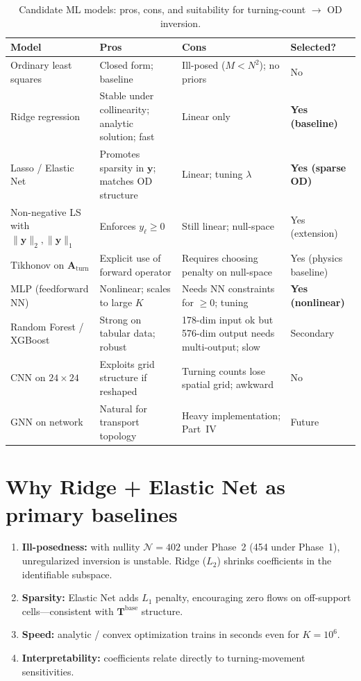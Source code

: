 \documentclass[11pt,a4paper]{report}
\newcommand{\Tbase}{\mathbf{T}^{\mathrm{base}}}
\newcommand{\mathbfy}{\mathbf{y}}
\newcommand{\Aturn}{\mathbf{A}_{\mathrm{turn}}}
\begin{document}
\begin{table}[ht]
\centering
\caption{Candidate ML models: pros, cons, and suitability for turning-count $\to$ OD inversion.}
\label{tab:models}
\footnotesize
\begin{tabular}{@{}p{2.8cm}p{3.8cm}p{3.8cm}p{2.8cm}@{}}
\toprule
\textbf{Model} & \textbf{Pros} & \textbf{Cons} & \textbf{Selected?} \\
\midrule
Ordinary least squares &
Closed form; baseline &
Ill-posed ($M<N^2$); no priors &
No \\
\midrule
Ridge regression &
Stable under collinearity; analytic solution; fast &
Linear only &
\textbf{Yes (baseline)} \\
\midrule
Lasso / Elastic Net &
Promotes sparsity in $\mathbfy$; matches OD structure &
Linear; tuning $\lambda$ &
\textbf{Yes (sparse OD)} \\
\midrule
Non-negative LS with $\|\mathbfy\|_2,\|\mathbfy\|_1$ &
Enforces $y_\ell\ge 0$ &
Still linear; null-space &
Yes (extension) \\
\midrule
Tikhonov on $\Aturn$ &
Explicit use of forward operator &
Requires choosing penalty on null-space &
Yes (physics baseline) \\
\midrule
MLP (feedforward NN) &
Nonlinear; scales to large $K$ &
Needs NN constraints for $\ge 0$; tuning &
\textbf{Yes (nonlinear)} \\
\midrule
Random Forest / XGBoost &
Strong on tabular data; robust &
178-dim input ok but 576-dim output needs multi-output; slow &
Secondary \\
\midrule
CNN on $24\times 24$ &
Exploits grid structure if reshaped &
Turning counts lose spatial grid; awkward &
No \\
\midrule
GNN on network &
Natural for transport topology &
Heavy implementation; Part~IV &
Future \\
\bottomrule
\end{tabular}
\end{table}

\section{Why Ridge + Elastic Net as primary baselines}

\begin{enumerate}[leftmargin=*]
    \item \textbf{Ill-posedness:} with nullity $\mathcal{N}=402$ under Phase~2 (454 under Phase~1), unregularized inversion is unstable. Ridge ($L_2$) shrinks coefficients in the identifiable subspace.
    \item \textbf{Sparsity:} Elastic Net adds $L_1$ penalty, encouraging zero flows on off-support cells---consistent with $\Tbase$ structure.
    \item \textbf{Speed:} analytic / convex optimization trains in seconds even for $K=10^6$.
    \item \textbf{Interpretability:} coefficients relate directly to turning-movement sensitivities.
\end{enumerate}
\end{document}
